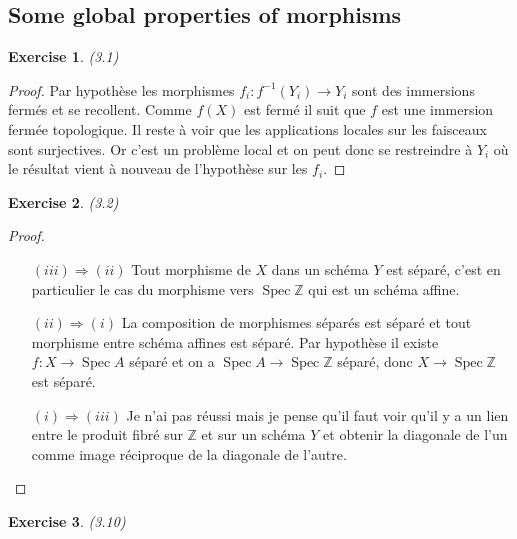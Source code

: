 \documentclass[A4, 11pt]{article}
\newtheorem{exer}{Exercise}
\def\Z{{\mathbb Z}}
\def\Spec{ \operatorname{Spec}}
\begin{document}
 \subsection{Some global properties of morphisms}
 \begin{exer}(3.1)
 \end{exer}
 \begin{proof}
 Par hypothèse les morphismes $f_i\colon f^{-1}(Y_i)\rightarrow Y_i$ sont des immersions fermés et se recollent. Comme $f(X)$ est fermé il suit que $f$ est une immersion fermée topologique. Il reste à voir que les applications locales sur les faisceaux sont surjectives. Or c'est un problème local et on peut donc se restreindre à $Y_i$ où le résultat vient à nouveau de l'hypothèse sur les $f_i$. 
 \end{proof}
 \begin{exer}(3.2)
 \end{exer}
 \begin{proof}
 \begin{itemize}
 \item[$(iii)\Rightarrow (ii)$] Tout morphisme de $X$ dans un schéma $Y$ est séparé, c'est en particulier le cas du morphisme vers $\Spec \Z$ qui est un schéma affine.
  \item[$(ii)\Rightarrow (i)$] La composition de morphismes séparés est séparé et tout morphisme entre schéma affines est séparé. Par hypothèse il existe $f\colon X\rightarrow \Spec A$ séparé et on a $\Spec A \rightarrow \Spec \Z$ séparé, donc $X\rightarrow \Spec \Z$ est séparé.
   \item[$(i)\Rightarrow (iii)$] Je n'ai pas réussi mais je pense qu'il faut voir qu'il y a un lien entre le produit fibré sur $\Z$ et sur un schéma $Y$ et obtenir la diagonale de l'un comme image réciproque de la diagonale de l'autre. 
 \end{itemize}
 \end{proof}
 \begin{exer}(3.10)
 \end{exer}
\end{document}
